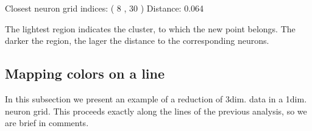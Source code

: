 \documentclass[letterpaper,10pt,english]{jupyterBook}
\begin{document}
\begin{sphinxVerbatim}[commandchars=\\\{\}]
Closest neuron grid indices: ( 8 , 30 )
Distance:  0.064
\end{sphinxVerbatim}

\noindent{}

\sphinxAtStartPar
The lightest region indicates the cluster, to which the new point belongs. The darker the region, the lager the distance to the corresponding neurons.


\subsection{Mapping colors on a line}
\label{\detokenize{docs/som:mapping-colors-on-a-line}}
\sphinxAtStartPar
In this subsection we present an example of a reduction of 3\sphinxhyphen{}dim. data in a 1\sphinxhyphen{}dim. neuron grid. This proceeds exactly along the lines of the previous analysis, so we are brief in comments.

\begin{sphinxVerbatim}[commandchars=\\\{\}]
\PYG{p}{[}    \PYG{p}{]}



   
    \PYG{p}{[}\PYG{p}{]} 
\end{sphinxVerbatim}

\noindent{}
\end{document}
